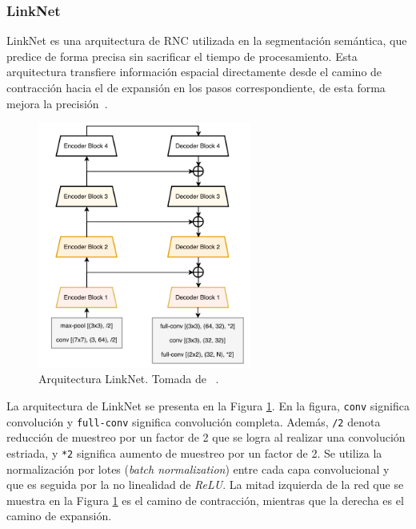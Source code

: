 \subsubsection{LinkNet}

LinkNet es una arquitectura de RNC utilizada en la segmentación semántica, que predice de forma precisa sin sacrificar el tiempo de procesamiento. Esta arquitectura transfiere información espacial directamente desde el camino de contracción hacia el de expansión en los pasos correspondiente, de esta forma mejora la precisión~\cite{chaurasia2017linknet}.

\begin{figure}[ht]
	\centering
	\includegraphics[width=7cm]{./Graphics/linknet.png}
	\caption{Arquitectura LinkNet. Tomada de ~\cite{chaurasia2017linknet}.}
	\label{fig:linknet}
\end{figure}

La arquitectura de LinkNet se presenta en la Figura \ref{fig:linknet}. En la figura, \verb|conv| significa convolución y \verb|full-conv| significa convolución completa. Además, \verb|/2| denota reducción de muestreo por un factor de 2 que se logra al realizar una convolución estriada, y \verb|*2| significa aumento de muestreo por un factor de 2. Se utiliza la normalización por lotes (\textit{batch normalization}) entre cada capa convolucional y que es seguida por la no linealidad de \textit{ReLU}. La mitad izquierda de la red que se muestra en la Figura \ref{fig:linknet} es el camino de contracción, mientras que la derecha es el camino de expansión.

